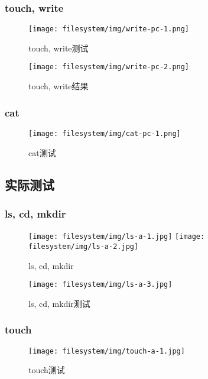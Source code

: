 \subsubsection{touch, write}

\begin{figure}[H]
  \centering
  \texttt{[image: filesystem/img/write-pc-1.png]}
  \caption{touch, write测试}
\end{figure}

\begin{figure}[H]
  \centering
  \texttt{[image: filesystem/img/write-pc-2.png]}
  \caption{touch, write结果}
\end{figure}

\subsubsection{cat}

\begin{figure}[H]
  \centering
  \texttt{[image: filesystem/img/cat-pc-1.png]}
  \caption{cat测试}
\end{figure}

\newpage
\subsection{实际测试}

\subsubsection{ls, cd, mkdir}

\begin{figure}[H]
  \centering
  \texttt{[image: filesystem/img/ls-a-1.jpg]}
  \texttt{[image: filesystem/img/ls-a-2.jpg]}
  \caption{ls, cd, mkdir}
\end{figure}

\begin{figure}[H]
  \centering
  \texttt{[image: filesystem/img/ls-a-3.jpg]}
  \caption{ls, cd, mkdir测试}
\end{figure}

\subsubsection{touch}

\begin{figure}[H]
  \centering
  \texttt{[image: filesystem/img/touch-a-1.jpg]}
  \caption{touch测试}
\end{figure}

